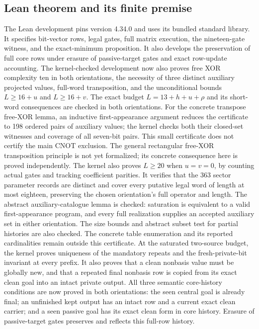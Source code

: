 \documentclass[11pt]{article}
\begin{document}
\subsection*{Lean theorem and its finite premise}
The Lean development pins version 4.34.0 and uses its bundled standard
library. It specifies bit-vector rows, legal gates, full matrix execution,
the nineteen-gate witness, and the exact-minimum proposition. It also
develops the preservation of full core rows under erasure of passive-target
gates and exact row-update accounting. The kernel-checked development now
also proves free XOR complexity ten in both orientations, the necessity
of three distinct auxiliary projected values, full-word transposition,
and the unconditional bounds $L\geq16+u$ and $L\geq16+v$.
The exact budget $L=13+h+u+\rho$ and its short-word consequences are checked
in both orientations. For the concrete transpose free-XOR lemma, an
inductive first-appearance argument reduces the certificate to 198
ordered pairs of auxiliary values; the kernel checks both their
closed-set witnesses and coverage of all seven-bit pairs. This small
certificate does not certify the main CNOT exclusion. The general
rectangular free-XOR transposition principle is not yet formalized;
its concrete consequence here is proved independently.
The kernel also proves $L\geq20$ when $u=v=0$, by counting actual gates
and tracking coefficient parities. It verifies that the 363 sector parameter
records are distinct and cover every putative legal word of length at most
eighteen, preserving the chosen orientation's full operator and length.
The abstract auxiliary-catalogue lemma is checked: saturation is equivalent
to a valid first-appearance program, and every full realization supplies an
accepted auxiliary set in either orientation. The size bounds and abstract
subset test for partial histories are also checked. The concrete table
enumeration and its reported cardinalities remain outside this certificate.
At the saturated two-source budget, the kernel proves uniqueness of the
mandatory repeats and the fresh-private-bit invariant at every prefix.
It also proves that a clean nonbasis value must be globally new, and that
a repeated final nonbasis row is copied from its exact clean goal into an
intact private output. All three semantic core-history conditions are now
proved in both orientations: the seen central goal is already final; an
unfinished kept output has an intact row and a current exact clean carrier;
and a seen passive goal has its exact clean form in core history. Erasure
of passive-target gates preserves and reflects this full-row history.
\end{document}
